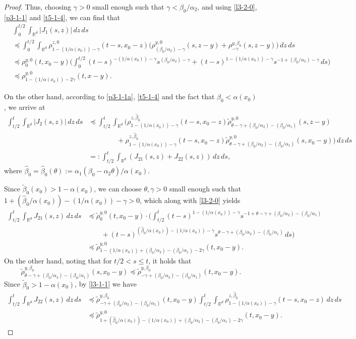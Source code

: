 \documentclass[a4paper,11pt]{amsart}
\renewcommand{\le}{\leqslant}
\newcommand{\R}{\mathds R}
\newcommand{\B}{\beta}
\newcommand{\T}{\theta}
\newcommand{\p}{\preceq}
\newcommand{\A}{\alpha}
\newcommand{\G}{\gamma}
\def\wh{\widehat}
\theoremstyle{definition}
\begin{document}
\begin{proof}
Thus, choosing $\G>0$ small enough such that $\G<\B_0/\A_2$, and using \eqref{l3-2-0}, \eqref{p3-1-1} and
\eqref{t5-1-4}, we can find that
\begin{align*}
&\int_0^{t/2}\int_{\R^d}|J_1(s,z)|\,dz\,ds\\
&\p
\int_0^{t/2}\int_{\R^d}\rho^{z,0}_{1-({1/\A(x_0)})-\G}(t-s,x_0-z)
\big(
\rho^{y,0}_{({\B_0}/{\A_2})-\G}(s,z-y)+
\rho^{y,\B_0}_{-\G}(s,z-y)\big)\,dz\,ds\\
&\p \rho^{y,0}_0(t,x_0-y)\!\bigg(\!\int_0^{t/2}\!(t\!-\!s)^{-(1/\A(x_0))-\G}s^{(\B_0/\A_2)-\G}\! +\!
(t\!-\!s)^{1-(1/\A(x_0))-\G}s^{-1+(\B_0/\A_2)-\G}\,ds \bigg)\\
&\p \rho^{y,0}_{1-(1/\A(x_0))-2\G}(t,x-y).
\end{align*}

On the other hand, according to \eqref{p3-1-1a}, \eqref{t5-1-4} and the fact that $\B_0<\A(x_0)$, we arrive at
\begin{align*}
 \int_{t/2}^t\int_{\R^d}|J_2(s,z)|\,dz\,ds
&\p \int_{t/2}^t\int_{\R^d}
\bigg(\rho^{z,\wh \B_0}_{1-({1/\A(x_0)})-\G}(t-s,x_0-z)\tilde\rho^{y,0}_{\theta-\gamma+(\B_0/\A_2)-{(\B_0/\A_1)}}
(s,z-y)
\\
&\qquad\qquad
+\rho^{z,\wh \B_0}_{1-({1/\A(x_0)})-\G}(t-s,x_0-z)\tilde\rho^{y,0}_{\theta-\gamma+(\B_0/\A_2)-{(\B_0/\A_1)}}(s,x_0-y)\bigg)\,dz\,ds\\
&=:\int_{t/2}^t \int_{\R^d}(J_{21}(s,z)+J_{22}(s,z))\,dz\,ds,
\end{align*}
where $\wh \B_0=\wh \B_0(\theta):={\A_1(\B_0-\A_2\theta)}/{\A(x_0)}$.

Since $\tilde \B_0(x_0)>1-\A(x_0)$, we can choose
$\theta, \G>0$ small enough such that $1+(\wh \B_0/\A(x_0))-(1/\A(x_0))-\G>0$, which along with
\eqref{l3-2-0} yields
\begin{align*}
\int_{t/2}^t \int_{\R^d}J_{21}(s,z)\,dz\,ds
&\p \tilde \rho^{y,0}_0(t,x_0-y)\cdot\Big(
\int_{t/2}^t (t-s)^{1-(1/\A(x_0))-\G}s^{-1+\T-\G+(\B_0/\A_2)-(\B_0/\A_1)}\\
&\quad \quad +(t-s)^{(\wh \B_0/\A(x_0))-
(1/\A(x_0))-\G}s^{\T-\G+(\B_0/\A_2)-(\B_0/\A_1)}\,ds\Big)\\
&\p\tilde \rho^{y,0}_{1-(1/\A(x_0))+(\B_0/\A_2)-(\B_0/\A_1)-2\G}(t,x_0-y).
\end{align*}
On the other hand, noting that for $t/2<s\le t$, it holds that
\begin{equation}\label{t5-1-5}
\tilde \rho^{y,\B_0}_{\theta-\gamma+(\B_0/\A_2)-{(\B_0/\A_1)}}(s,x_0-y)\p
\tilde \rho^{y,\B_0}_{-\gamma+(\B_0/\A_2)-{(\B_0/\A_1)}}(t,x_0-y).
\end{equation}
Since $\tilde \B_0>1-\A(x_0)$, by \eqref{l3-1-1} we have
\begin{align*}
 \int_{t/2}^t \int_{\R^d}J_{22}(s,z)\,dz\,ds
&\p
\tilde \rho^{y,\B_0}_{-\gamma+(\B_0/\A_2)-(\B_0/\A_1)}(t,x_0-y)
\int_{t/2}^t\int_{\R^d}\rho^{z,\wh \B_0}_{1-({1/\A(x_0)})-\G}(t-s,x_0-z)\,dz\,ds\\
&\p \tilde \rho^{y,0}_{1+(\wh \B_0/\A(x_0))-(1/\A(x_0))+
(\B_0/\A_2)-(\B_0/\A_1)-2\G}(t,x_0-y).
\end{align*}




\end{proof}
\end{document}
